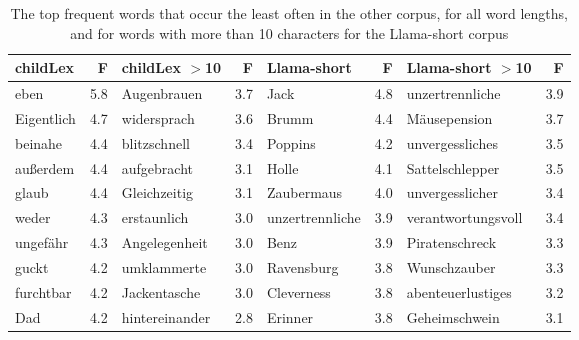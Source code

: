 \documentclass[doc, a4paper, anonymous]{apa7}
\begin{document}
\begin{table}[!htbp]
\caption{The top frequent words that occur the least often in the other corpus, for all word lengths, and for words with more than 10 characters for the Llama-short corpus}
\centering
\begin{tabular}{lrlrlrlr}
  \hline
childLex & F & childLex $>$10 & F & Llama-short & F & Llama-short $>$10 & F \\ 
  \hline
eben & 5.8 & Augenbrauen & 3.7 & Jack & 4.8 & unzertrennliche & 3.9 \\ 
  Eigentlich & 4.7 & widersprach & 3.6 & Brumm & 4.4 & Mäusepension & 3.7 \\ 
  beinahe & 4.4 & blitzschnell & 3.4 & Poppins & 4.2 & unvergessliches & 3.5 \\ 
  außerdem & 4.4 & aufgebracht & 3.1 & Holle & 4.1 & Sattelschlepper & 3.5 \\ 
  glaub & 4.4 & Gleichzeitig & 3.1 & Zaubermaus & 4.0 & unvergesslicher & 3.4 \\ 
  weder & 4.3 & erstaunlich & 3.0 & unzertrennliche & 3.9 & verantwortungsvoll & 3.4 \\ 
  ungefähr & 4.3 & Angelegenheit & 3.0 & Benz & 3.9 & Piratenschreck & 3.3 \\ 
  guckt & 4.2 & umklammerte & 3.0 & Ravensburg & 3.8 & Wunschzauber & 3.3 \\ 
  furchtbar & 4.2 & Jackentasche & 3.0 & Cleverness & 3.8 & abenteuerlustiges & 3.2 \\ 
  Dad & 4.2 & hintereinander & 2.8 & Erinner & 3.8 & Geheimschwein & 3.1 \\ 
   \hline
\end{tabular}
\label{words-llsh-low}
\end{table}
\end{document}
